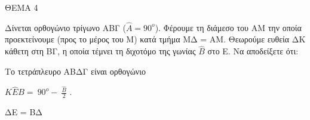 
ΘΕΜΑ 4

Δίνεται ορθογώνιο τρίγωνο ΑΒΓ ($\widehat{Α} = 90^{ο}$). Φέρουμε τη διάμεσο του ΑΜ την οποία προεκτείνουμε (προς το μέρος του Μ) κατά τμήμα ΜΔ = ΑΜ. Θεωρούμε ευθεία ΔΚ κάθετη στη ΒΓ, η οποία τέμνει τη διχοτόμο της γωνίας $\widehat{Β}$ στο Ε. Να αποδείξετε ότι:

\begin{alist}
\item Το τετράπλευρο ΑΒΔΓ είναι ορθογώνιο 

\item $Κ\widehat{Ε}Β = \ 90^{ο} - \ \frac{\widehat{Β}}{2}$ . 

\item ΔΕ = ΒΔ 


\end{alist}
